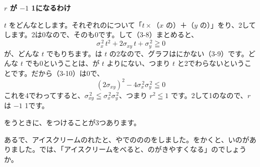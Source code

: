 \begin{motto}[3]
\textbf{$r$ が $-1$ 1になるわけ}\par
$t$ をどんなとします。それぞれのについて「$t\times$（$x$ の）＋（$y$ の）」をり、2してします。2は0なので、そのも0です。して（3-8）まとめると、
\[ \sigma_x^{\,2}\,t^2+2\sigma_{xy}\,t+\sigma_y^{\,2}\geqq0 \]
が、どんな $t$ でもりちます。は $t$ の2なので、グラフはにかない（3-9）です。どんな $t$ でも0ということは、が $t$ よりにない、つまり $t$ と2でわらないということです。だから（3-10）は0で、
\[ (2\sigma_{xy})^2-4\sigma_x^{\,2}\sigma_y^{\,2}\leqq0 \]
これを4でわってすると、$\sigma_{xy}^{\,2}\leqq\sigma_x^{\,2}\sigma_y^{\,2}$、つまり $r^2\leqq1$ です。2して1のなので、$r$ は $-1$ 1です。
\end{motto}




\leavevmode\label{bk:3-15:inga}をうときに、をつけることが3つあります。

あるで、アイスクリームのれたと、やでのののをしました。をかくと、いのがありました。では、「アイスクリームをべると、のがきやすくなる」のでしょうか。

